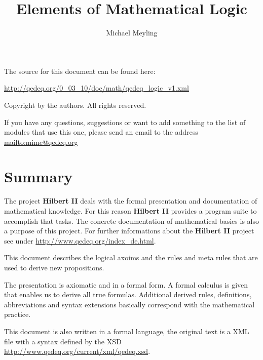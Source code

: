 \documentclass[a4paper,german,10pt,twoside]{book}
\title{Elements of Mathematical Logic}
\author{
Michael Meyling
}
\theoremstyle{definition}
\theoremstyle{remark}
\begin{document}
\maketitle

\setlength{\parskip}{5pt plus 2pt minus 1pt}
\mbox{}
\vfill

\par
The source for this document can be found here:
\par
\url{http://qedeq.org/0_03_10/doc/math/qedeq_logic_v1.xml}

\par
Copyright by the authors. All rights reserved.
\par
If you have any questions, suggestions or want to add something to the list of modules that use this one, please send an email to the address \url{mailto:mime@qedeq.org}

\setlength{\parskip}{0pt}
\tableofcontents

\setlength{\parskip}{5pt plus 2pt minus 1pt}

\chapter*{Summary} \label{chapter0} \hypertarget{chapter0}{}

The project \textbf{Hilbert II} deals with the formal presentation and documentation of mathematical knowledge. For this reason \textbf{Hilbert II} provides a program suite to accomplish that tasks. The concrete documentation of mathematical basics is also a purpose of this project.   
For further informations about the \textbf{Hilbert II} project see under \url{http://www.qedeq.org/index_de.html}.

\par
This document describes the logical axoims and the rules and meta rules that are used to derive new propositions.

\par
The presentation is axiomatic and in a formal form. A formal calculus is given that enables us to derive all true formulas. Additional derived rules, definitions, abbreviations and syntax extensions basically correspond with the mathematical practice.

\par
This document is also written in a formal language, the original text is a XML file with a syntax defined by the XSD \url{http://www.qedeq.org/current/xml/qedeq.xsd}.
\end{document}
